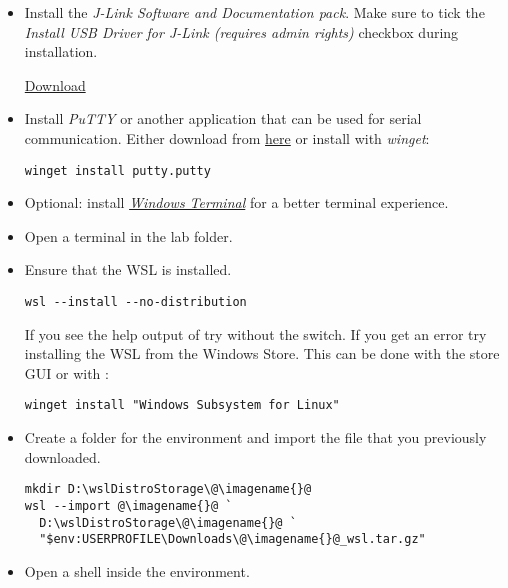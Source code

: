 \begin{itemize}
  \item Install the \emph{J-Link Software and Documentation pack}. Make sure to
        tick the \emph{Install USB Driver for J-Link (requires admin rights)}
        checkbox during installation.

        \href{https://www.segger.com/downloads/jlink/JLink_Windows_x86_64.exe}{Download}

  \item Install \emph{PuTTY} or another application that can be used for serial
      communication. Either download from \href{https://putty.org/}{here} or
      install with \emph{winget}:

        \begin{lstlisting}
winget install putty.putty
\end{lstlisting}

  \item Optional: install \href{https://aka.ms/terminal}{\emph{Windows
      Terminal}} for a better terminal experience.

  \item Open a terminal in the lab folder.

  \item Ensure that the WSL is installed.
        \begin{lstlisting}
wsl --install --no-distribution
\end{lstlisting}
        \begin{infobox}
          If you see the help output of  try without the
           switch. If you get an error try installing
          the WSL from the Windows Store. This can be done with the store GUI
          or with :
          \begin{lstlisting}
winget install "Windows Subsystem for Linux"
\end{lstlisting}
        \end{infobox}
  \item Create a folder for the environment and import the file that you
        previously downloaded.
        \begin{lstlisting}
mkdir D:\wslDistroStorage\@\imagename{}@
wsl --import @\imagename{}@ `
  D:\wslDistroStorage\@\imagename{}@ `
  "$env:USERPROFILE\Downloads\@\imagename{}@_wsl.tar.gz"
\end{lstlisting}
  \item Open a shell inside the environment.


\end{itemize}
